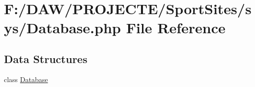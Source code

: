 \hypertarget{_database_8php}{}\section{F\+:/\+D\+A\+W/\+P\+R\+O\+J\+E\+C\+T\+E/\+Sport\+Sites/sys/\+Database.php File Reference}
\label{_database_8php}
\subsection*{Data Structures}
\begin{DoxyCompactItemize}
\item 
class \hyperlink{class_database}{Database}
\end{DoxyCompactItemize}
